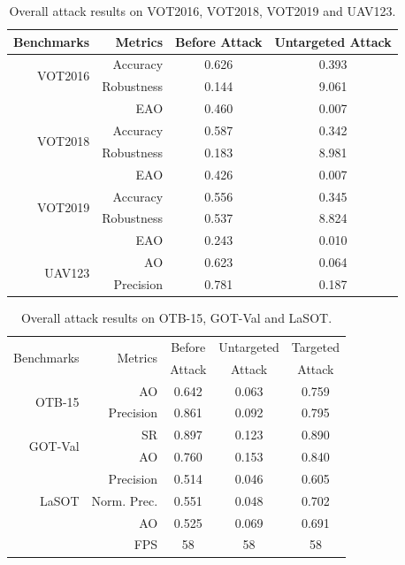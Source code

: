 \documentclass[journal]{IEEEtran}
\begin{document}
\begin{table}[t]
  \centering
  \caption{Overall attack results on VOT2016, VOT2018, VOT2019 and UAV123.}
  \begin{tabular}{rrcc}
  \toprule
  Benchmarks & Metrics & Before Attack    & Untargeted Attack  \\
  \midrule
  \multirow{2}{*}[-6pt]{VOT2016} 
  & Accuracy   & 0.626 & 0.393\\
  & Robustness & 0.144 & 9.061\\
  & EAO        & 0.460 & 0.007\\
  \midrule
  \multirow{2}{*}[-6pt]{VOT2018} 
  & Accuracy   & 0.587 & 0.342\\
  & Robustness & 0.183 & 8.981\\
  & EAO        & 0.426 & 0.007\\
  \midrule
  \multirow{2}{*}[-6pt]{VOT2019} 
  & Accuracy   & 0.556 & 0.345\\
  & Robustness & 0.537 & 8.824\\
  & EAO        & 0.243 & 0.010\\
  \midrule
  \multirow{3}{*}[+6pt]{UAV123} 
  & AO  & 0.623 & 0.064\\
  & Precision & 0.781 & 0.187\\
  \bottomrule
  \end{tabular}
  \label{tab:benchmark results1}
\end{table}

\begin{table}[t]
  \centering
  \caption{Overall attack results on OTB-15, GOT-Val and LaSOT.}
  \begin{tabular}{rrccc}
  \toprule
  \multirow{2}{*}{Benchmarks} & \multirow{2}{*}{Metrics} & Before    & Untargeted & Targeted  \\
                            &                         & Attack & Attack & Attack     \\ 
  \midrule
  \multirow{2}{*}{OTB-15} 
  & AO   & 0.642 & 0.063 & 0.759\\
  & Precision & 0.861 & 0.092 & 0.795\\
  \midrule
  \multirow{2}{*}{GOT-Val} 
  & SR & 0.897 & 0.123 & 0.890\\
  & AO & 0.760 & 0.153 & 0.840 \\
  \midrule
  \multirow{3}{*}{LaSOT} 
  & Precision  & 0.514 & 0.046 & 0.605\\
  & Norm. Prec.& 0.551 & 0.048 & 0.702\\
  & AO         & 0.525 & 0.069 & 0.691\\
  \midrule
  \multicolumn{2}{r}{FPS} & 58 & 58 & 58\\
  \bottomrule
  \end{tabular}
  \label{tab:benchmark results}
\end{table}
\end{document}
